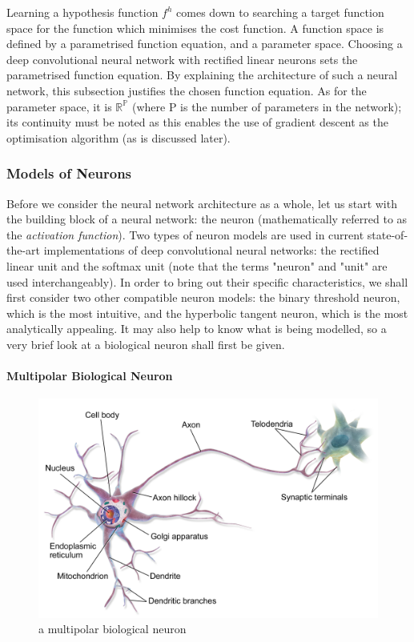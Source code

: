 \documentclass[a4paper,11pt]{article}
\begin{document}
Learning a hypothesis function $f^{h}$ comes down to searching a target function space for the function which minimises the cost function. A function space is defined by a parametrised function equation, and a parameter space. Choosing a deep convolutional neural network with rectified linear neurons sets the parametrised function equation. By explaining the architecture of such a neural network, this subsection justifies the chosen function equation. As for the parameter space, it is $\mathbb{R^{P}}$ (where P is the number of parameters in the network); its continuity must be noted as this enables the use of gradient descent as the optimisation algorithm (as is discussed later). \\


\subsubsection{Models of Neurons}

Before we consider the neural network architecture as a whole, let us start with the building block of a neural network: the neuron (mathematically referred to as the \textit{activation function}). Two types of neuron models are used in current state-of-the-art implementations of deep convolutional neural networks: the rectified linear unit and the softmax unit (note that the terms "neuron" and "unit" are used interchangeably). In order to bring out their specific characteristics, we shall first consider two other compatible neuron models: the binary threshold neuron, which is the most intuitive, and the hyperbolic tangent neuron, which is the most analytically appealing. It may also help to know what is being modelled, so a very brief look at a biological neuron shall first be given.

\paragraph{Multipolar Biological Neuron}

\begin{figure}[h!]
	\centering
	\includegraphics[scale=0.3]{images/Biological_Neuron.png}
	\caption{a multipolar biological neuron}
\end{figure}
\end{document}
